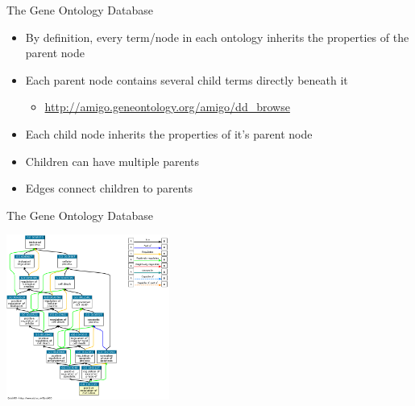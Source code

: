 \documentclass[aspectratio=169,11pt]{beamer}
\begin{document}
\begin{frame}{The Gene Ontology Database}

	\begin{itemize}
		\item By definition, every term/node in each ontology inherits the properties of the parent node
		\item Each parent node contains several child terms directly beneath it 
		\begin{itemize}
			\item \url{http://amigo.geneontology.org/amigo/dd_browse}
		\end{itemize}
		\pause
		\item Each child node inherits the properties of it's parent node
		\item Children can have multiple parents
		\item Edges connect children to parents
	\end{itemize}

\end{frame}

\begin{frame}{The Gene Ontology Database}

	\begin{center}
	\includegraphics[width=0.4\textwidth]{figures/apoptosisDAG.png} 
	\end{center}


\end{frame}
\end{document}
